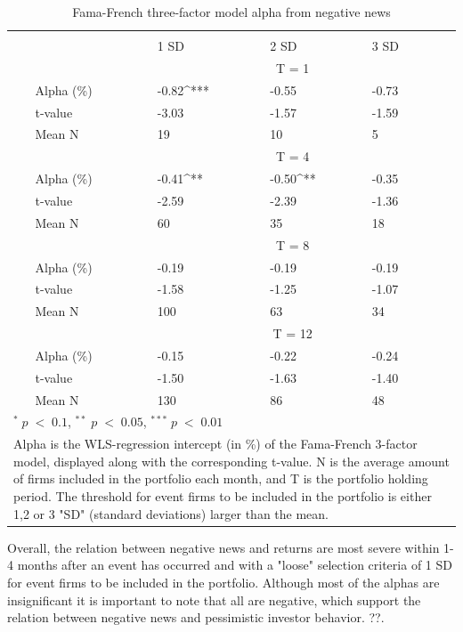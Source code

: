 \setlength{\tabcolsep}{15pt}
\begin{table}[h]
\small
\centering
\caption{Fama-French three-factor model alpha from negative news } 
\begin{tabular}{llllllc}
\hline \hline \\ 
 &     &  &    1 SD  &  2 SD  &  3 SD  &  \\ \cline{4-6} 
& & & \multicolumn{3}{c}{ T = 1} & \\ \cline{2-6}
& Alpha (\%)  &  & -0.82^{***}  & -0.55  & -0.73 &  \\ 
& t-value &  & -3.03 & -1.57  & -1.59 &  \\
& Mean N       &  &  19    & 10  & 5  & \\
& & & \multicolumn{3}{c}{ T = 4} & \\ \cline{2-6}
& Alpha (\%)  &  & -0.41^{**}  & -0.50^{**}  &  -0.35 & \\
& t-value &  & -2.59 & -2.39  & -1.36 & \\
& Mean N       &  & 60      & 35  & 18  & \\
& & & \multicolumn{3}{c}{ T = 8} & \\ \cline{2-6}
& Alpha (\%)   &  & -0.19   & -0.19  & -0.19 &  \\
& t-value &  & -1.58  & -1.25 & -1.07 &  \\
& Mean N       &  & 100 & 63   & 34 & \\
& & & \multicolumn{3}{c}{ T = 12} & \\ \cline{2-6}
& Alpha (\%)   &  & -0.15  & -0.22  & -0.24 &  \\
& t-value &  & -1.50  & -1.63 & -1.40 & \\
& Mean N       &  & 130    & 86  & 48 \\\hline \hline
 \multicolumn{7}{l}{ \footnotesize $^* \; p\; <\; 0.1$, $ ^{**} \; p\; <\; 0.05$, $ ^{***} \; p\; <\; 0.01$  } \\
 \multicolumn{7}{p{11.5cm}}{ \footnotesize Alpha is the WLS-regression intercept (in \%) of the Fama-French 3-factor model, displayed along with the corresponding t-value. N is the average amount of firms included in the portfolio each month, and T is the portfolio holding period. The threshold for event firms to be included in the portfolio is either 1,2 or 3 "SD" (standard deviations) larger than the mean.} \\ 
\end{tabular}
\label{tab: FF3-neg}
\end{table}

Overall, the relation between negative news and returns are most severe within 1-4 months after an event has occurred and with a "loose" selection criteria of 1 SD for event firms to be included in the portfolio. Although most of the alphas are insignificant it is important to note that all are negative, which support the relation between negative news and pessimistic investor behavior.  
??. 



